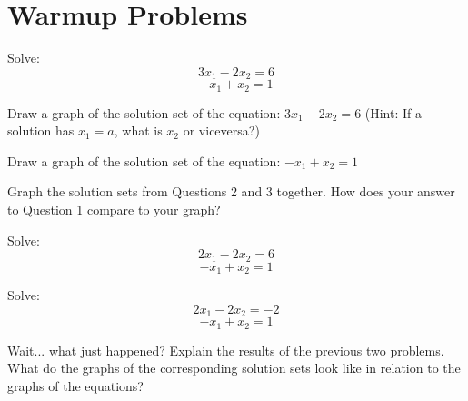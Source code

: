 \section{Warmup Problems}
\begin{annotation}
\end{annotation}
\begin{question} Solve:
$$ 3x_1-2x_2=6 $$
$$-x_1+x_2=1 $$
\end{question}

\begin{question} Draw a graph of the solution set of the equation: $3x_1-2x_2=6$ (Hint: If a solution has $x_1=a$, what is $x_2$ or viceversa?)
\end{question}

\begin{question} Draw a graph of the solution set of the equation: $-x_1+x_2=1$
\end{question}

\begin{question}\label{q2} Graph the solution sets from Questions 2 and 3 together. How does your answer to Question 1 compare to your graph?
\end{question}

\begin{question} Solve:
$$ 2x_1-2x_2=6 $$
$$-x_1+x_2=1 $$
\end{question}

\begin{question} Solve:
$$ 2x_1-2x_2=-2 $$
$$-x_1+x_2=1 $$
\end{question}

\begin{question} Wait... what just happened? Explain the results of the previous two problems. What do the graphs of the corresponding solution sets look like in relation to the graphs of the equations?
\end{question}


